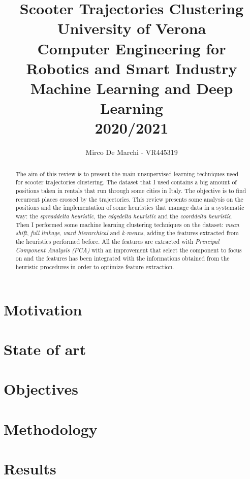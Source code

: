 \documentclass[]{IEEEtran}
\title{Scooter Trajectories Clustering\\
	{\large University of Verona\\Computer Engineering for Robotics and Smart Industry\\Machine Learning and Deep Learning\\2020/2021\\}}
\author{Mirco De Marchi - VR445319}
\begin{document}
\maketitle

\begin{abstract}
	The aim of this review is to present the main unsupervised learning techniques used for scooter trajectories clustering. The dataset that I used contains a big amount of positions taken in rentals that run through some cities in Italy. The objective is to find recurrent places crossed by the trajectories. This review presents some analysis on the positions and the implementation of some heuristics that manage data in a systematic way: the \textit{spreaddelta heuristic}, the \textit{edgedelta heuristic} and the \textit{coorddelta heuristic}. Then I performed some machine learning clustering techniques on the dataset: \textit{mean shift}, \textit{full linkage}, \textit{ward hierarchical} and \textit{k-means}, adding the features extracted from the heuristics performed before. All the features are extracted with \textit{Principal Component Analysis (PCA)} with an improvement that select the component to focus on and the features has been integrated with the informations obtained from the heuristic procedures in order to optimize feature extraction. 
\end{abstract}

\section{Motivation}


\section{State of art}


\section{Objectives}


\section{Methodology}


\section{Results}

\end{document}

